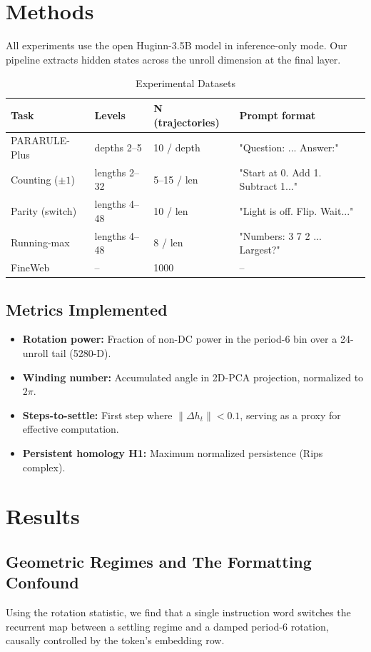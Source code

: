 \documentclass{article}
\begin{document}
\section{Methods}

All experiments use the open Huginn-3.5B model in inference-only mode. Our pipeline extracts hidden states across the unroll dimension at the final layer.

\begin{table}[H]
\centering
\caption{Experimental Datasets}
\begin{tabular}{llll}
\toprule
Task & Levels & N (trajectories) & Prompt format \\
\midrule
PARARULE-Plus & depths 2--5 & 10 / depth & "Question: ... Answer:" \\
Counting ($\pm1$) & lengths 2--32 & 5--15 / len & "Start at 0. Add 1. Subtract 1..." \\
Parity (switch) & lengths 4--48 & 10 / len & "Light is off. Flip. Wait..." \\
Running-max & lengths 4--48 & 8 / len & "Numbers: 3 7 2 ... Largest?" \\
FineWeb & -- & 1000 & -- \\
\bottomrule
\end{tabular}
\end{table}

\subsection{Metrics Implemented}
\begin{itemize}
    \item \textbf{Rotation power:} Fraction of non-DC power in the period-6 bin over a 24-unroll tail (5280-D).
    \item \textbf{Winding number:} Accumulated angle in 2D-PCA projection, normalized to $2\pi$.
    \item \textbf{Steps-to-settle:} First step where $\|\Delta h_t\| < 0.1$, serving as a proxy for effective computation.
    \item \textbf{Persistent homology H1:} Maximum normalized persistence (Rips complex).
\end{itemize}

\section{Results}

\subsection{Geometric Regimes and The Formatting Confound}
Using the rotation statistic, we find that a single instruction word switches the recurrent map between a settling regime and a damped period-6 rotation, causally controlled by the token's embedding row. 
\end{document}
